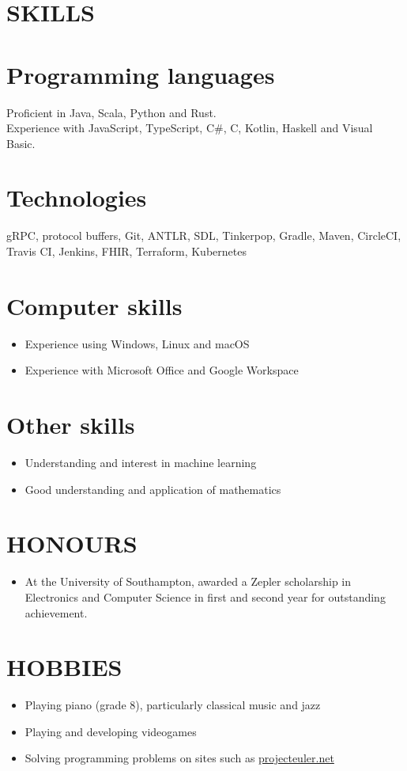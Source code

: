 \documentclass[margin]{res}
\begin{document}
\begin{resume}
\section{SKILLS}

\normalsize{\section{Programming languages}}
Proficient in Java, Scala, Python and Rust. \\
Experience with JavaScript, TypeScript, C\#, C, Kotlin, Haskell and Visual Basic.

\normalsize{\section{Technologies}}
gRPC, protocol buffers, Git, ANTLR, SDL, Tinkerpop, Gradle, Maven, CircleCI, Travis CI, Jenkins, FHIR, Terraform, Kubernetes

\normalsize{\section{Computer skills}}
\begin{itemize}
\item Experience using Windows, Linux and macOS
\item Experience with Microsoft Office and Google Workspace
\end{itemize}

\normalsize{\section{Other skills}}
\begin{itemize}
\item Understanding and interest in machine learning
\item Good understanding and application of mathematics
\end{itemize}

\section{HONOURS}
\begin{itemize}
\item At the University of Southampton, awarded a Zepler scholarship in
Electronics and Computer Science in first and second year for outstanding
achievement.
\end{itemize}

\section{HOBBIES}
\begin{itemize}
\item Playing piano (grade 8), particularly classical music and jazz
\item Playing and developing videogames
\item Solving programming problems on sites such as
\href{https://projecteuler.net/}{projecteuler.net}
\end{itemize}

\end{resume}
\end{document}
